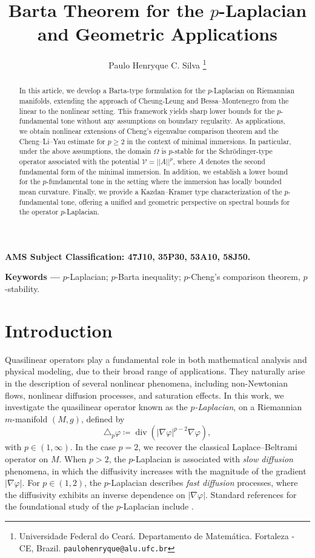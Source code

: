 \documentclass{article}
\title{Barta Theorem for the $p$-Laplacian \\and Geometric Applications}
\author{Paulo Henryque C. Silva \thanks{Universidade Federal do Ceará. Departamento de Matemática. Fortaleza - CE, Brazil. \texttt{paulohenryque@alu.ufc.br}}%
}
\providecommand{\keywords}[1]{%
  \small\textbf{Keywords ---} #1
}
\begin{document}
\maketitle
    
\begin{abstract}
\noindent In this article, we develop a Barta-type formulation for the $p$-Laplacian on Riemannian manifolds, extending the approach of Cheung-Leung \cite{cheung} and  Bessa--Montenegro \cite{BessaMontenegro}  from the linear to the nonlinear setting. This framework yields sharp lower bounds for the $p$-fundamental tone without any assumptions on boundary regularity. As applications, we obtain nonlinear extensions of Cheng’s eigenvalue comparison theorem and  the Cheng--Li--Yau estimate for $p \geq 2$ in the context of minimal immersions. In particular, under the above assumptions, the domain $\Omega$ is $p$-stable for the Schr\"odinger-type operator associated with the potential $\mathcal{V} = ||A||^{p}$, where $A$ denotes the second fundamental form of the minimal immersion. In addition, we establish a lower bound for the $p$-fundamental tone in the setting where the immersion has locally bounded mean curvature. Finally, we provide a Kazdan--Kramer type characterization of the $p$-fundamental tone, offering a unified and geometric perspective on spectral bounds for the operator $p$-Laplacian.
\end{abstract}

\textbf{AMS Subject Classification: 47J10, 35P30, 53A10, 58J50.} 

 \keywords{$p$-Laplacian; $p$-Barta inequality; $p$-Cheng's comparison theorem, $p$-stability.}

\section{Introduction} 
Quasilinear operators play a fundamental role in both mathematical analysis
and physical modeling, due to their broad range of applications. They naturally
arise in the description of several nonlinear phenomena, including non-Newtonian
flows, nonlinear diffusion processes, and saturation effects. In this work,
we investigate the quasilinear operator known as the \emph{$p$-Laplacian}, on a Riemannian $m$-manifold $(M,g)$, defined by
\begin{equation}
    \triangle_p \varphi \coloneq \operatorname{div}(|\nabla \varphi |^{p-2}\nabla \varphi),
\end{equation}
with $p\in(1,\infty)$. In the case $p=2$, we recover the classical Laplace--Beltrami operator on $M$. 
When $p>2$, the $p$-Laplacian is associated with \emph{slow diffusion} phenomena, in which the diffusivity increases with the magnitude of the gradient $|\nabla \varphi|$. For $p \in (1,2)$, the $p$-Laplacian describes \emph{fast diffusion} processes, where the diffusivity exhibits an inverse dependence on $|\nabla \varphi|$. Standard references for the foundational study of the
$p$-Laplacian include \cite{anane, le, lindqvist, lindqvist92}.
\end{document}
